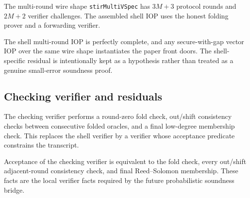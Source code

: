\begin{definition}\label{def:stir_multi_round_iop}
    The multi-round wire shape \texttt{stirMultiVSpec} has $3M+3$ protocol rounds and $2M+2$
    verifier challenges.  The assembled shell IOP uses the honest folding prover and a
    forwarding verifier.
\end{definition}

\begin{theorem}\label{thm:stir_multi_round_front_doors}
    The shell multi-round IOP is perfectly complete, and any secure-with-gap vector IOP over
    the same wire shape instantiates the paper front doors.  The shell-specific residual is
    intentionally kept as a hypothesis rather than treated as a genuine small-error soundness
    proof.
\end{theorem}

\subsection{Checking verifier and residuals}\label{sec:stir_checking_verifier}

\begin{definition}\label{def:stir_checking_verifier}
    The checking verifier performs a round-zero fold check, out/shift consistency checks between
    consecutive folded oracles, and a final low-degree membership check.  This replaces the shell
    verifier by a verifier whose acceptance predicate constrains the transcript.
\end{definition}

\begin{lemma}\label{lem:stir_checking_predicate}
    Acceptance of the checking verifier is equivalent to the fold check, every out/shift
    adjacent-round consistency check, and final Reed--Solomon membership.  These facts are the
    local verifier facts required by the future probabilistic soundness bridge.
\end{lemma}

